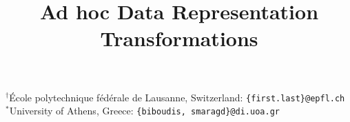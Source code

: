 \documentclass[10pt]{style/sigplanconf}
\begin{document}
\setlength{\pdfpageheight}{\paperheight}
\setlength{\pdfpagewidth}{\paperwidth}

\toappear{}


\title{\Automating Ad hoc Data Representation Transformations}

 {
$^\dagger$École polytechnique fédérale de Lausanne, Switzerland: \texttt{\{first.last\}@epfl.ch}\qquad \\
$^*$University of Athens, Greece: \texttt{\{biboudis, smaragd\}@di.uoa.gr}
}

\maketitle



% 














\end{document}
